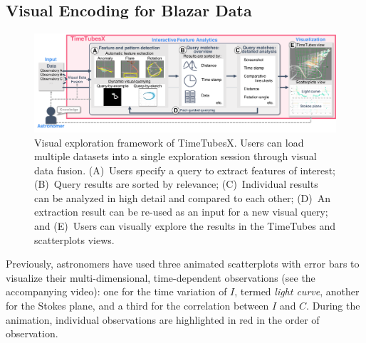 \subsection{Visual Encoding for Blazar Data}\label{sec:VisualEncoding}
\begin{figure}
    \centering
    \includegraphics[width=.99\linewidth]{vgtc_journal_latex/figures/workflowGray.pdf}
    \caption{Visual exploration framework of TimeTubesX. Users can load multiple datasets into a single exploration session through visual data fusion. (A)~Users specify a query to extract features of interest; (B)~Query results are sorted by relevance; (C)~Individual results can be analyzed in high detail and compared to each other; (D)~An extraction result can be re-used as an input for a new visual query; and (E)~Users can visually explore the results in the TimeTubes and scatterplots views.}
    \label{fig:framework}
\end{figure}
Previously, astronomers have used three animated scatterplots with error bars to visualize their multi-dimensional, time-dependent observations (see the accompanying video): one for the time variation of $I$, termed \textit{light curve}, another for the Stokes plane, and a third for the correlation between $I$ and $C$.
During the animation, individual observations are highlighted in red in the order of observation.
%

